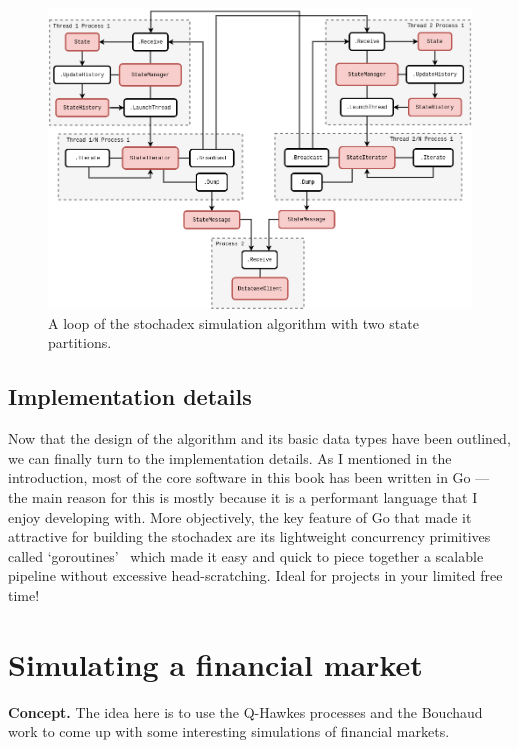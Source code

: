 \documentclass{book}
\begin{document}
\begin{figure}[h]
\centering
\includegraphics[width=15cm]{images/stochadex-loop.drawio.png}
\caption{A loop of the stochadex simulation algorithm with two state partitions.}
\label{fig:loop-design}
\end{figure}


\section{\sffamily Implementation details}

Now that the design of the algorithm and its basic data types have been outlined, we can finally turn to the implementation details. As I mentioned in the introduction, most of the core software in this book has been written in Go --- the main reason for this is mostly because it is a performant language that I enjoy developing with. More objectively, the key feature of Go that made it attractive for building the stochadex are its lightweight concurrency primitives called `goroutines'~\cite{goroutines} which made it easy and quick to piece together a scalable pipeline without excessive head-scratching. Ideal for projects in your limited free time!



\chapter{\sffamily Simulating a financial market}

{\bfseries\sffamily Concept.} The idea here is to use the Q-Hawkes processes and the Bouchaud work to come up with some interesting simulations of financial markets. 
\end{document}
